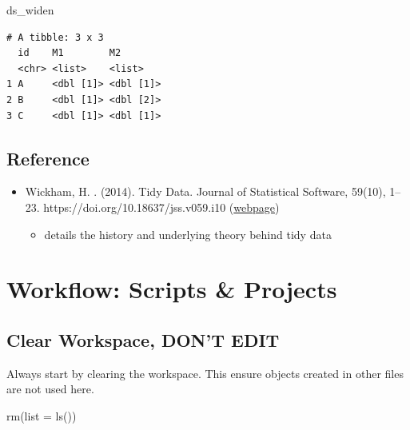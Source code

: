 \documentclass[
  letterpaper,
  DIV=11,
  numbers=noendperiod]{scrreprt}
\newenvironment{Shaded}{\begin{snugshade}}{\end{snugshade}}
\newcommand{\AttributeTok}[1]{\textcolor[rgb]{0.40,0.45,0.13}{#1}}
\newcommand{\FunctionTok}[1]{\textcolor[rgb]{0.28,0.35,0.67}{#1}}
\newcommand{\NormalTok}[1]{\textcolor[rgb]{0.00,0.23,0.31}{#1}}
\providecommand{\tightlist}{%
  \setlength{\itemsep}{0pt}\setlength{\parskip}{0pt}}\usepackage{longtable,booktabs,array}
\begin{document}
\begin{Shaded}
\begin{Highlighting}[]
\NormalTok{ds\_widen}
\end{Highlighting}
\end{Shaded}

\begin{verbatim}
# A tibble: 3 x 3
  id    M1        M2       
  <chr> <list>    <list>   
1 A     <dbl [1]> <dbl [1]>
2 B     <dbl [1]> <dbl [2]>
3 C     <dbl [1]> <dbl [1]>
\end{verbatim}

\section{Reference}\label{reference}

\begin{itemize}
\tightlist
\item
  Wickham, H. . (2014). Tidy Data. Journal of Statistical Software,
  59(10), 1--23. https://doi.org/10.18637/jss.v059.i10
  (\href{https://www.jstatsoft.org/article/view/v059i10}{webpage})

  \begin{itemize}
  \tightlist
  \item
    details the history and underlying theory behind tidy data
  \end{itemize}
\end{itemize}

\chapter{Workflow: Scripts \& Projects}\label{workflow-scripts-projects}

\section*{Clear Workspace, DON'T
EDIT}\label{clear-workspace-dont-edit-7}


Always start by clearing the workspace. This ensure objects created in
other files are not used here.

\begin{Shaded}
\begin{Highlighting}[]
\FunctionTok{rm}\NormalTok{(}\AttributeTok{list =} \FunctionTok{ls}\NormalTok{())}
\end{Highlighting}
\end{Shaded}
\end{document}
